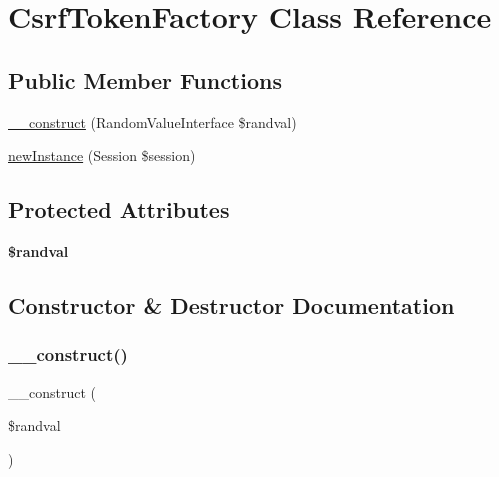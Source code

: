 \hypertarget{class_aura_1_1_session_1_1_csrf_token_factory}{}\section{Csrf\+Token\+Factory Class Reference}
\label{class_aura_1_1_session_1_1_csrf_token_factory}
\subsection*{Public Member Functions}
\begin{DoxyCompactItemize}
\item 
\mbox{\hyperlink{class_aura_1_1_session_1_1_csrf_token_factory_aeee2a69efd73d86a6253a0a97356d6a2}{\+\_\+\+\_\+construct}} (Random\+Value\+Interface \$randval)
\item 
\mbox{\hyperlink{class_aura_1_1_session_1_1_csrf_token_factory_a130f025e3eab3b75c4707399c0a9e61b}{new\+Instance}} (Session \$session)
\end{DoxyCompactItemize}
\subsection*{Protected Attributes}
\begin{DoxyCompactItemize}
\item 
\mbox{\label{class_aura_1_1_session_1_1_csrf_token_factory_a8894e3a0375b8470fd717113bea66940}} 
{\bfseries \$randval}
\end{DoxyCompactItemize}


\subsection{Constructor \& Destructor Documentation}
\mbox{\label{class_aura_1_1_session_1_1_csrf_token_factory_aeee2a69efd73d86a6253a0a97356d6a2}} 
\subsubsection{\texorpdfstring{\+\_\+\+\_\+construct()}{\_\_construct()}}
{\footnotesize\ttfamily \+\_\+\+\_\+construct (\begin{DoxyParamCaption}\item[{Random\+Value\+Interface}]{\$randval }\end{DoxyParamCaption})}

